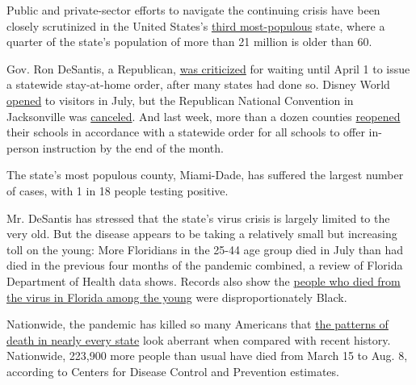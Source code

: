 Public and private-sector efforts to navigate the continuing crisis have
been closely scrutinized in the United States's
\href{https://www.census.gov/newsroom/press-releases/2014/cb14-232.html\#:~:text=By\%20adding\%20an\%20average\%20of,this\%20period\%2C\%20reaching\%2019.9\%20million.}{third
most-populous} state, where a quarter of the state's population of more
than 21 million is older than 60.

Gov. Ron DeSantis, a Republican,
\href{https://www.thecentersquare.com/florida/criticism-mounts-as-desantis-resists-statewide-stay-at-home-order/article_5e9c558a-6ed9-11ea-b058-8b911dd7d11e.html}{was
criticized} for waiting until April 1 to issue a statewide stay-at-home
order, after many states had done so. Disney World
\href{https://www.nytimes3xbfgragh.onion/2020/07/11/business/florida-coronavirus-disney-world-reopening.html}{opened}
to visitors in July, but the Republican National Convention in
Jacksonville was
\href{https://www.nytimes3xbfgragh.onion/2020/07/24/us/politics/trump-republican-convention-canceled-jacksonville.html}{canceled}.
And last week, more than a dozen counties
\href{https://www.nytimes3xbfgragh.onion/2020/08/19/us/coronavirus-schools-florida-local-control.html}{reopened}
their schools in accordance with a statewide order for all schools to
offer in-person instruction by the end of the month.

The state's most populous county, Miami-Dade, has suffered the largest
number of cases, with 1 in 18 people testing positive.

Mr. DeSantis has stressed that the state's virus crisis is largely
limited to the very old. But the disease appears to be taking a
relatively small but increasing toll on the young: More Floridians in
the 25-44 age group died in July than had died in the previous four
months of the pandemic combined, a review of Florida Department of
Health data shows. Records also show the
\href{https://www.nytimes3xbfgragh.onion/2020/08/11/us/virus-young-deaths.html}{people
who died from the virus in Florida among the young} were
disproportionately Black.

Nationwide, the pandemic has killed so many Americans that
\href{https://www.nytimes3xbfgragh.onion/interactive/2020/05/05/us/coronavirus-death-toll-us.html}{the
patterns of death in nearly every state} look aberrant when compared
with recent history. Nationwide, 223,900 more people than usual have
died from March 15 to Aug. 8, according to Centers for Disease Control
and Prevention estimates.

